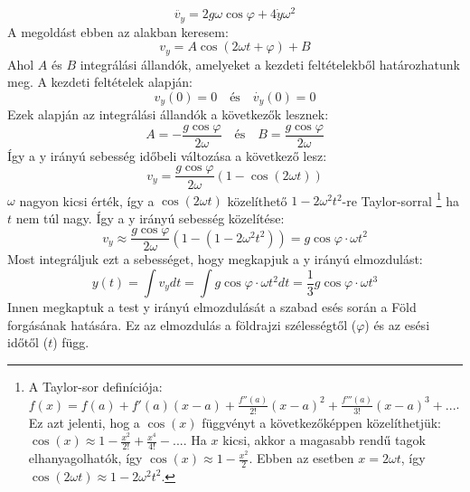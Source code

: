 \documentclass[../main.tex]{subfiles}
\begin{document}
\begin{equation}
    \ddot{v_y} = 2g\omega\cos\varphi + 4\dot{y}\omega^2
\end{equation}
A megoldást ebben az alakban keresem:
\begin{equation}
    v_y = A\cos(2\omega t + \varphi) + B
\end{equation}
Ahol $A$ és $B$ integrálási állandók, amelyeket a kezdeti feltételekből határozhatunk meg. A kezdeti feltételek alapján:
\begin{equation}
    v_y(0) = 0 \quad \text{és} \quad \dot{v_y}(0) = 0
\end{equation}
Ezek alapján az integrálási állandók a következők lesznek:
\begin{equation}
    A = -\frac{g\cos\varphi}{2\omega} \quad \text{és} \quad B = \frac{g\cos\varphi}{2\omega}
\end{equation}
Így a y irányú sebesség időbeli változása a következő lesz:
\begin{equation}
    v_y = \frac{g\cos\varphi}{2\omega}(1 - \cos(2\omega t))
\end{equation}
$\omega$ nagyon kicsi érték, így a $\cos(2\omega t)$ közelíthető $1 - 2\omega^2 t^2$-re Taylor-sorral
\footnote{A Taylor-sor definíciója: $f(x) = f(a) + f'(a)(x-a) + \frac{f''(a)}{2!}(x-a)^2 + \frac{f'''(a)}{3!}(x-a)^3 + ...$. Ez azt jelenti, hog a $\cos(x)$ függvényt a következőképpen közelíthetjük: $\cos(x) \approx 1 - \frac{x^2}{2!} + \frac{x^4}{4!} - ...$. Ha $x$ kicsi, akkor a magasabb rendű tagok elhanyagolhatók, így $\cos(x) \approx 1 - \frac{x^2}{2}$. Ebben az esetben $x = 2\omega t$, így $\cos(2\omega t) \approx 1 - 2\omega^2 t^2$.}
ha $t$ nem túl nagy. Így a y irányú sebesség közelítése:
\begin{equation}
    v_y \approx \frac{g\cos\varphi}{2\omega}(1 - (1 - 2\omega^2 t^2)) = g\cos\varphi \cdot \omega t^2
\end{equation}
Most integráljuk ezt a sebességet, hogy megkapjuk a y irányú elmozdulást:
\begin{equation}
    y(t) = \int v_y dt = \int g\cos\varphi \cdot \omega t^2 dt = \frac{1}{3}g\cos\varphi \cdot \omega t^3
\end{equation}
Innen megkaptuk a test y irányú elmozdulását a szabad esés során a Föld forgásának hatására. Ez az elmozdulás a földrajzi szélességtől ($\varphi$) és az esési időtől ($t$) függ.
\end{document}
